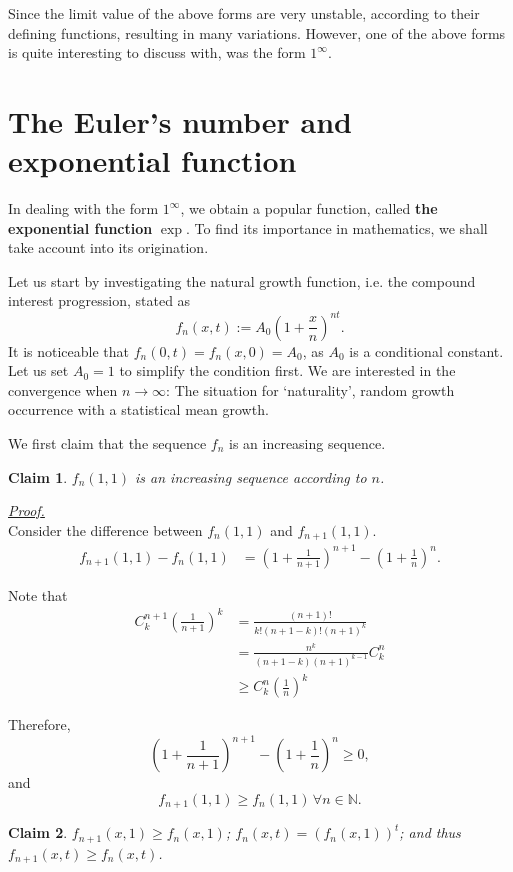 \documentclass[12pt]{article}
\newtheorem*{claim}{Claim}
\renewenvironment{proof}[1][Proof]{\begin{snugshade*} \underline{\textit{{#1}.}}\\}{\hfill \qedsymbol \end{snugshade*}}
\begin{document}
    Since the limit value of the above forms are very unstable, according to their defining functions, resulting in many variations. However, one of the above forms is quite interesting to discuss with, was the form $1^\infty$.
    \section{The Euler's number and exponential function}

    In dealing with the form $1^\infty$, we obtain a popular function, called \textbf{the exponential function} $\exp$. To find its importance in mathematics, we shall take account into its origination.

    Let us start by investigating the natural growth function, i.e. the compound interest progression, stated as \[f_n(x,t):=A_0(1+\frac{x}{n})^{nt}.\] It is noticeable that $f_n(0,t)=f_n(x,0)=A_0$, as $A_0$ is a conditional constant. Let us set $A_0=1$ to simplify the condition first. We are interested in the convergence when $n\to \infty$: The situation for `naturality', random growth occurrence with a statistical mean growth.

    We first claim that the sequence $f_n$ is an increasing sequence.
    
    \begin{claim}
        $f_n(1,1)$ is an increasing sequence according to $n$.
    \end{claim}

    \begin{proof}
        Consider the difference between $f_n(1,1)$ and $f_{n+1}(1,1)$.
        \begin{align*}
            f_{n+1}(1,1)-f_n(1,1)&=(1+\frac{1}{n+1})^{n+1}-(1+\frac{1}{n})^n.
        \end{align*}
        
        Note that \begin{align*}
            C_k^{n+1}(\frac{1}{n+1})^k&=\frac{(n+1)!}{k!(n+1-k)!(n+1)^k}\\
            &=\frac{n^k}{(n+1-k)(n+1)^{k-1}}C_k^n\\
            &\geq C_k^n(\frac{1}{n})^k
        \end{align*}

        Therefore, \[(1+\frac{1}{n+1})^{n+1}-(1+\frac{1}{n})^n\geq 0,\] and \[f_{n+1}(1,1)\geq f_n(1,1)\,\forall n\in\mathbb{N}.\]
    \end{proof}

    \begin{claim}
        $f_{n+1}(x,1)\geq f_n(x,1)$; $f_n(x,t)=(f_n(x,1))^t$; and thus $f_{n+1}(x,t)\geq f_n(x,t)$.
    \end{claim}
\end{document}
